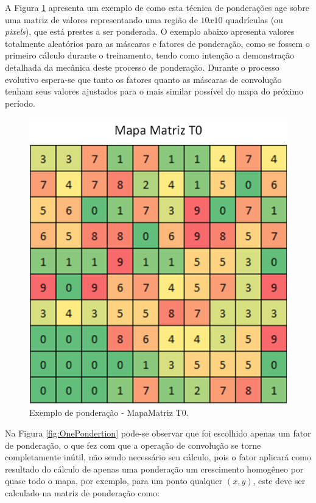 A Figura \ref{fig:MapaMatrizT0} apresenta um exemplo de como esta técnica de ponderações age sobre uma matriz de valores representando uma região de \(10x10\) quadrículas (ou \emph{pixels}), que está prestes a ser ponderada. O exemplo abaixo apresenta valores totalmente aleatórios para as máscaras e fatores de ponderação, como se fossem o primeiro cálculo durante o treinamento, tendo como intenção a demonstração detalhada da mecânica deste processo de ponderação. Durante o processo evolutivo espera-se que tanto os fatores quanto as máscaras de convolução tenham seus valores ajustados para o mais similar possível do mapa do próximo período. 

\begin{figure}[h]
	\centering	\includegraphics[scale=0.6]{Figuras/PonderationsExample-MatrixMap.png}
\caption{Exemplo de ponderação - MapaMatriz T0.}
\label{fig:MapaMatrizT0}
\end{figure}

Na Figura \ref{fig:OnePondertion} pode-se observar que foi escolhido apenas um fator de ponderação, o que fez com que a operação de convolução se torne completamente inútil, não sendo necessário seu cálculo, pois o fator aplicará como resultado do cálculo de apenas uma ponderação um crescimento homogêneo por quase todo o mapa, por exemplo, para um ponto qualquer \((x,y)\), este deve ser calculado na matriz de ponderação como:

